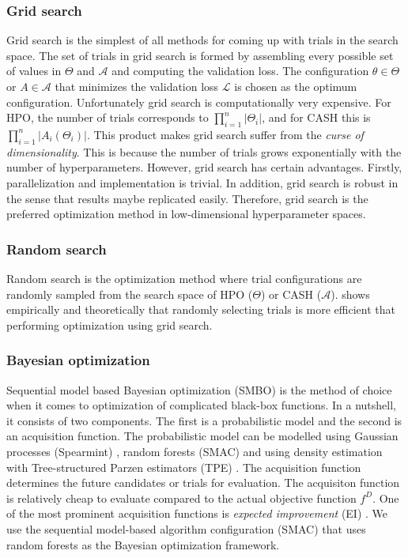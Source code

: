 \subsubsection{Grid search}
\label{subsubsec1}
Grid search is the simplest of all methods for coming up with trials in the search space. The set of trials in grid search is formed by assembling every possible set of values in $\Theta$ and $\mathcal{A}$ and computing the validation loss. The configuration $\theta \in \Theta$ or $A \in \mathcal{A}$ that minimizes the validation loss $\mathcal{L}$ is chosen as the optimum configuration. Unfortunately grid search is computationally very expensive. For HPO, the number of trials corresponds to $\prod_{i=1}^n |\Theta_i|$, and for CASH this is $\prod_{i=1}^n |A_i(\Theta_i)|$. This product makes grid search suffer from the \textit{curse of dimensionality}. This is because the number of trials grows exponentially with the number of hyperparameters. However, grid search has certain advantages. Firstly, parallelization and implementation is trivial. In addition, grid search is robust in the sense that results maybe replicated easily. Therefore, grid search is the preferred optimization method in low-dimensional hyperparameter spaces.

\subsubsection{Random search}
\label{subsubsec2}
Random search is the optimization method where trial configurations are randomly sampled from the search space of HPO ($\Theta$) or CASH ($\mathcal{A}$). \cite{bergstra2012random} shows empirically and theoretically that randomly selecting trials is more efficient that performing optimization using grid search.

\subsubsection{Bayesian optimization}
\label{subsubsec1}
Sequential model based Bayesian optimization (SMBO) \cite{hutter2011sequential} is the method of choice when it comes to optimization of complicated black-box functions. In a nutshell, it consists of two components. The first is a probabilistic model and the second is an acquisition function. The probabilistic model can be modelled using Gaussian processes (Spearmint) \cite{snoek2012practical}, random forests (SMAC) \cite{hutter2011sequential} and using density estimation with Tree-structured Parzen estimators (TPE) \cite{bergstra2011algorithms}. The acquisition function determines the future candidates or trials for evaluation. The acquisiton function is relatively cheap to evaluate compared to the actual objective function $f^D$. One of the most prominent acquisition functions is \textit{expected improvement} (EI) \cite{movckus1975bayesian}. We use the sequential model-based algorithm configuration (SMAC) that uses random forests as the Bayesian optimization framework. 

